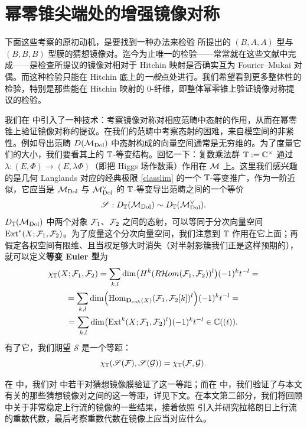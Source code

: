 
\section{幂零锥尖端处的增强镜像对称}\label{enhanced}

下面这些考察的原初动机，是要找到一种办法来检验 \cite{baraglia-schaposnik,garcia-prada-etal,hitchin-characteristic} 所提出的 $(B,A,A)$ 型与 $(B,B,B)$ 型膜的猜想镜像对。迄今为止唯一的检验——常常就在这些文献中完成——是检查所提议的镜像对相对于 Hitchin 映射是否确实互为 Fourier--Mukai 对偶。而这种检验只能在 Hitchin 底上的\emph{一般}点处进行。我们希望看到更多整体性的检验，特别是那些能在 Hitchin 映射的 $0$-纤维，即整体幂零锥上验证镜像对称提议的检验。

我们在 \cite{hausel-mellit-pei,hausel-hitchin} 中引入了一种技术：考察镜像对称对相应范畴中态射的作用，从而在幂零锥上验证镜像对称的提议。在我们的范畴中考察态射的困难，来自模空间的非紧性。例如导出范畴 $D({\mathcal{M}}_{\mathrm{Dol}})$ 中态射构成的向量空间通常是无穷维的。为了度量它们的大小，我们要看其上的 ${\mathbb{T}}$-等变结构。回忆一下：复数乘法群 ${\mathbb{T}}:=\mathbb{C}^\times$ 通过 $\lambda:(E,\Phi)\to (E,\lambda\Phi)$（即把 Higgs 场作数乘）作用在 ${\mathcal{M}}$ 上。这里我们感兴趣的是几何 Langlands 对应的经典极限 \eqref{classlim} 的一个 ${\mathbb{T}}$-等变推广，作为一阶近似，它应当是 ${\mathcal{M}}_{\mathrm{Dol}}$ 与 ${\mathcal{M}}^\vee_{{\mathrm{Dol}}}$ 的 ${\mathbb{T}}$-等变导出范畴之间的一个等价
\[
\mathscr{S}:D_{\mathbb{T}}({\mathcal{M}}_{\mathrm{Dol}}) \sim D_{\mathbb{T}}({\mathcal{M}}^\vee_{{\mathrm{Dol}}}).
\]
$D_{\mathbb{T}}({\mathcal{M}}_{\mathrm{Dol}})$ 中两个对象 ${\mathcal{F}}_1$、${\mathcal{F}}_2$ 之间的态射，可以等同于分次向量空间 $\operatorname{Ext}^*(X;{\mathcal{F}}_1,{\mathcal{F}}_2)$。为了度量这个分次向量空间，我们注意到 ${\mathbb{T}}$ 作用在它上面；再假定各权空间有限维、且当权足够大时消失（对半射影簇我们正是这样预期的），就可以定义\textbf{等变 Euler 型}为
\begin{multline*}
\chi_{\mathbb{T}}(X;{\mathcal{F}}_1,{\mathcal{F}}_2)=\sum_{k,l} \dim\bigl(H^k({R}{\mathcal Hom}({\mathcal{F}}_1,{\mathcal{F}}_2))^l\bigr) (-1)^k t^{-l}=\\
=\sum_{k,l} \dim\Bigl(\operatorname{Hom}_{{\mathbf D}_{coh}(X)}({\mathcal{F}}_1,{\mathcal{F}}_2[k])^l\Bigr) (-1)^k t^{-l}=\\
=\sum_{k,l} \dim\bigl(\operatorname{Ext}^k(X;{\mathcal{F}}_1,{\mathcal{F}}_2)^l\bigr) (-1)^k t^{-l} \in \mathbb{C}((t)).
\end{multline*}
有了它，我们期望 $\mathscr{S}$ 是一个等距：
\[
\chi_{\mathbb{T}}(\mathscr{S}({\mathcal{F}}),\mathscr{S}({\mathcal G}))=\chi_{\mathbb{T}}({\mathcal{F}},{\mathcal G}).
\]

在 \cite{hausel-mellit-pei} 中，我们对 \cite{hitchin-characteristic} 中若干对猜想镜像膜验证了这一等距；而在 \cite{hausel-hitchin} 中，我们验证了与本文有关的那些猜想镜像对之间的这一等距，详见下文。在本文第二部分，我们将回顾 \cite{hausel-hitchin} 中关于非常稳定上行流的镜像的一些结果，接着依照 \cite{hausel-hitchin1} 引入并研究拉格朗日上行流的重数代数，最后考察重数代数在镜像上应当对应什么。


